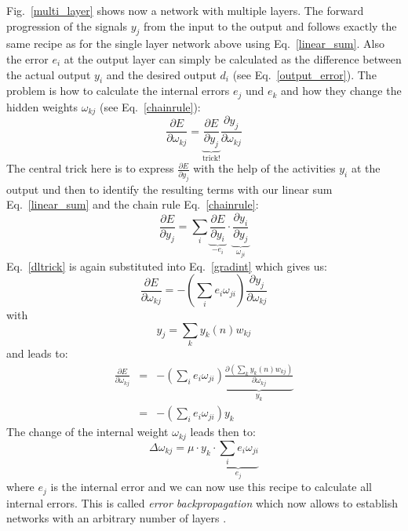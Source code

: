 \documentclass[12pt]{article}
\begin{document}
Fig.~\ref{multi_layer} shows now a network with multiple layers.
The forward progression of the signals $y_j$ from the input to
the output and follows exactly the same recipe as for the single
layer network above using Eq.~\ref{linear_sum}.
Also the error $e_i$ at the output layer can simply be calculated
as the difference between the actual output $y_i$ and the desired output $d_i$ (see
Eq.~\ref{output_error}). The problem is how to calculate the
internal errors $e_j$ und $e_k$ and how they change the hidden weights $\omega_{kj}$
(see Eq.~\ref{chainrule}):
\begin{equation}
  \frac{\partial E}{\partial \omega_{kj}} = \underbrace{\frac{\partial E}{\partial y_j}}_\textrm{trick!} \frac{\partial y_j}{\partial \omega_{kj}}
  \label{gradint}
\end{equation}
The central trick here is to express $\frac{\partial E}{\partial y_j}$
with the help of the activities $y_i$ at the output und then to
identify the resulting terms with our linear sum Eq.~\ref{linear_sum}
and the chain rule Eq.~\ref{chainrule}:
\begin{equation}
  \frac{\partial E}{\partial y_j} = \sum_i \underbrace{\frac{\partial E}{\partial y_i}}_{-e_i} \cdot \underbrace{\frac{\partial y_i}{\partial y_j}}_{\omega_{ji}} \label{dltrick}
\end{equation}
Eq.~\ref{dltrick} is again substituted into Eq.~\ref{gradint} which gives us:
\begin{equation}
  \frac{\partial E}{\partial \omega_{kj}} = - \left( \sum_i e_i \omega_{ji} \right) \frac{\partial y_j}{\partial \omega_{kj}}
  \label{gradintback}
\end{equation}
with
\begin{equation}
y_j = \sum_k y_k(n) w_{kj}
\end{equation}
and leads to:
\begin{eqnarray}
  \frac{\partial E}{\partial \omega_{kj}} & = & - \left( \sum_i e_i \omega_{ji} \right) \underbrace{\frac{\partial \left(\sum_k y_k(n) w_{kj}\right)}{\partial \omega_{kj}}}_{y_k} \\
                                         & = & - \left( \sum_i e_i \omega_{ji} \right) y_k
\end{eqnarray}
The change of the internal weight $\omega_{kj}$ leads then to:
\begin{equation}
\Delta\omega_{kj} = \mu \cdot y_k \cdot \underbrace{\sum_i e_i \omega_{ji}}_{e_j}
\end{equation}
where $e_j$ is the internal error and we can now use this recipe to
calculate all internal errors.  This is called \textsl{error
  backpropagation} which now allows to establish networks with an
arbitrary number of layers \citep{Widrow60,rumelhart1986learning}.
\end{document}
